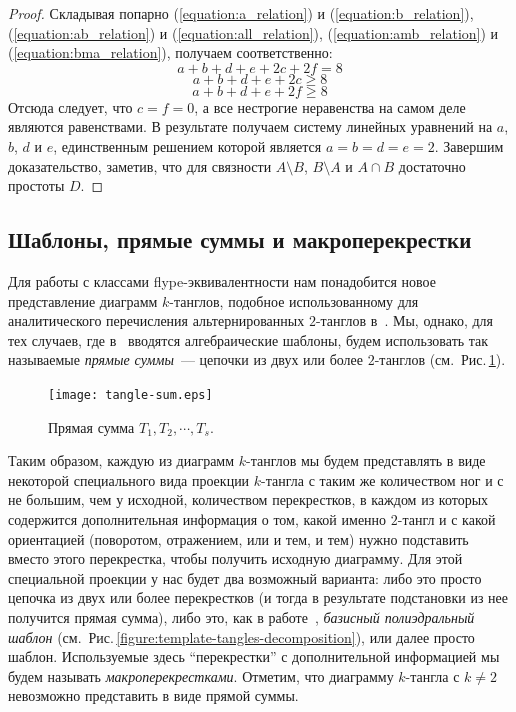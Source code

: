 \documentclass[12pt]{article}
\theoremstyle{plain}
\theoremstyle{definition}
\def\figureref#1{Рис.\,\protect\ref{#1}}
\begin{document}
\begin{proof}
			Складывая попарно (\ref{equation:a_relation}) и (\ref{equation:b_relation}),
			(\ref{equation:ab_relation}) и (\ref{equation:all_relation}),
			(\ref{equation:amb_relation}) и (\ref{equation:bma_relation}), получаем соответственно:
			\[a + b + d + e + 2c + 2f = 8\]
			\[a + b + d + e + 2c \ge 8\]
			\[a + b + d + e + 2f \ge 8\]
			Отсюда следует, что $c = f = 0$, а все нестрогие неравенства на самом деле являются равенствами. В результате
			получаем систему линейных уравнений на $a$, $b$, $d$ и $e$, единственным решением которой является
			$a = b = d = e = 2$. Завершим доказательство, заметив, что для связности $A\setminus B$, $B\setminus A$ и
			$A\cap B$ достаточно простоты $D$.
		\end{proof}

	\subsection{Шаблоны, прямые суммы и макроперекрестки}
	\label{subsection:subtangle-decomposition}

		Для работы с классами flype-эквивалентности нам понадобится новое представление диаграмм $k$-танглов, подобное
		использованному для аналитического перечисления альтернированных $2$-танглов в~\cite{SundbergThistlethwaite1998}.
		Мы, однако, для тех случаев, где в~\cite{SundbergThistlethwaite1998} вводятся алгебраические шаблоны, будем использовать
		так называемые \textit{прямые суммы}~--- цепочки из двух или более $2$-танглов (см.~\figureref{figure:tangle-sum}).

		\begin{figure}[ht]
			\centering
			\texttt{[image: tangle-sum.eps]}
			\caption{\footnotesize Прямая сумма $T_1, T_2, \cdots, T_s$.\label{figure:tangle-sum}}
		\end{figure}

		Таким образом, каждую из диаграмм $k$-танглов мы будем представлять в виде некоторой специального вида проекции $k$-тангла
		с таким же количеством ног и с не большим, чем у исходной, количеством перекрестков, в каждом из которых содержится дополнительная
		информация о том, какой именно $2$-тангл и с какой ориентацией (поворотом, отражением, или и тем, и тем) нужно подставить вместо
		этого перекрестка, чтобы получить исходную диаграмму. Для этой специальной проекции у нас будет два возможный варианта: либо
		это просто цепочка из двух или более перекрестков (и тогда в результате подстановки из нее получится прямая сумма), либо это,
		как в работе~\cite{SundbergThistlethwaite1998}, \textit{базисный полиэдральный шаблон} (см.~\figureref{figure:template-tangles-decomposition}),
		или далее просто шаблон. Используемые здесь ``перекрестки'' с дополнительной информацией мы будем называть \textit{макроперекрестками}.
		Отметим, что диаграмму $k$-тангла с $k \ne 2$ невозможно представить в виде прямой суммы.
\end{document}
